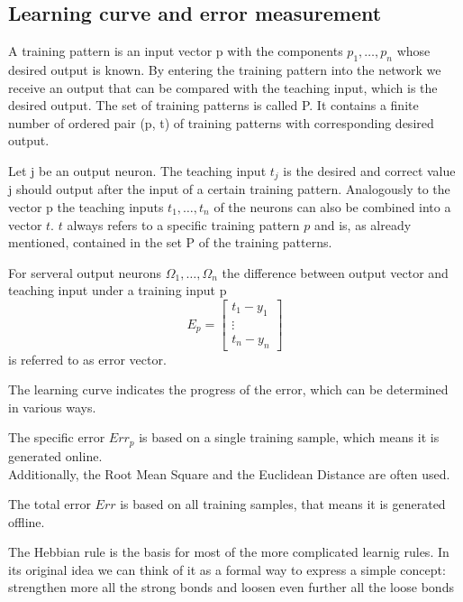\subsection{Learning curve and error measurement}
\begin{definition}
    A training pattern is an input vector p with the components $p_{1}, \ldots,p_{n}$ whose desired output is known. By entering the training pattern into the network we receive an output that can be compared with the teaching input, which is the desired output. The set of training patterns is called P. It contains a finite number of ordered pair (p, t) of training patterns with corresponding desired output.
\end{definition}
\begin{definition}
    Let j be an output neuron. The teaching input $t_j$ is the desired and correct value j should output after the input of a certain training pattern. Analogously to the vector p the teaching inputs $t_{1}, \ldots,t_{n}$ of the neurons can also be combined into a vector $t$. $t$ always refers to a specific training pattern $p$ and is, as already mentioned, contained in the set P of the training patterns.
\end{definition}
\begin{definition}
    For serveral output neurons $\Omega_{1}, \ldots,\Omega_{n}$ the difference between output vector and teaching input under a training input p
    \[ 
        E_p = \begin{bmatrix}
            t_1-y_1 \\
            \vdots\\
            t_n-y_n
        \end{bmatrix} 
    \]is referred to as error vector. 
\end{definition}
The learning curve indicates the progress of the error, which can be determined in various ways.
\begin{definition}
    The specific error $Err_p$ is based on a single training sample, which means it is generated online.\\
    Additionally, the Root Mean Square and the Euclidean Distance are often used.
\end{definition}
\begin{definition}
    The total error $Err$ is based on all training samples, that means it is generated offline.
\end{definition}
The Hebbian rule is the basis for most of the more complicated learnig rules. In its original idea we can think of it as a formal way to express a simple concept: strengthen more all the strong bonds and loosen even further all the loose bonds
